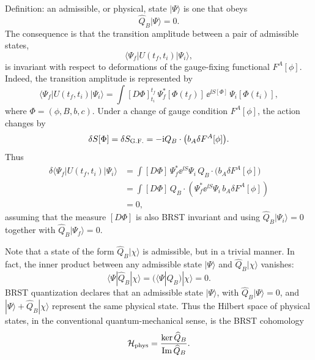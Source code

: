 Definition: an admissible, or physical, state \(|\Psi\rangle\) is one
that obeys
\[
  \widehat Q_B|\Psi\rangle=0.
\]
The consequence is that the transition amplitude between a pair of
admissible states,
\[
  \langle\Psi_f|U(t_f,t_i)|\Psi_i\rangle,
\]
is invariant with respect to deformations of the gauge-fixing functional
\(F^A[\phi]\).  Indeed, the transition amplitude is represented by
\[
  \langle\Psi_f|U(t_f,t_i)|\Psi_i\rangle
  =
  \int [D\Phi]_{t_i}^{t_f}\,
  \Psi_f^*[\Phi(t_f)]\,
  \ee^{\ii S[\Phi]}\,
  \Psi_i[\Phi(t_i)],
\]
where \(\Phi=(\phi,B,b,c)\).  Under a change of gauge condition
\(F^A[\phi]\), the action changes by
\[
  \delta S[\Phi]
  =
  \delta S_{\rm G.F.}
  =
  -\mathrm{i} Q_B\cdot\bigl(b_A\delta F^A[\phi]\bigr).
\]
Thus
\[
\begin{aligned}
  \delta\langle\Psi_f|U(t_f,t_i)|\Psi_i\rangle
  &=
  \int[D\Phi]\,
  \Psi_f^*\ee^{\ii S}\Psi_i\,
  Q_B\cdot\bigl(b_A\delta F^A[\phi]\bigr)
\\
  &=
  \int[D\Phi]\,
  Q_B\cdot
  \left(
    \Psi_f^*\ee^{\ii S}\Psi_i\,
    b_A\delta F^A[\phi]
  \right)
\\
  &=0,
\end{aligned}
\]
assuming that the measure \([D\Phi]\) is also BRST invariant and using
\(\widehat Q_B|\Psi_i\rangle=0\) together with
\(\widehat Q_B|\Psi_f\rangle=0\).

Note that a state of the form \(\widehat Q_B|\chi\rangle\) is admissible,
but in a trivial manner.  In fact, the inner product between any
admissible state \(|\Psi\rangle\) and \(\widehat Q_B|\chi\rangle\)
vanishes:
\[
  \langle\Psi|\widehat Q_B|\chi\rangle
  =
  \bigl(\langle\Psi|\widehat Q_B\bigr)|\chi\rangle
  =
  0.
\]
BRST quantization declares that an admissible state \(|\Psi\rangle\),
with \(\widehat Q_B|\Psi\rangle=0\), and
\(|\Psi\rangle+\widehat Q_B|\chi\rangle\) represent the same physical
state.  Thus the Hilbert space of physical states, in the conventional
quantum-mechanical sense, is the BRST cohomology
\[
  \mathcal H_{\rm phys}
  =
  \frac{\ker\widehat Q_B}{\mathrm{Im}\,\widehat Q_B}.
\]

